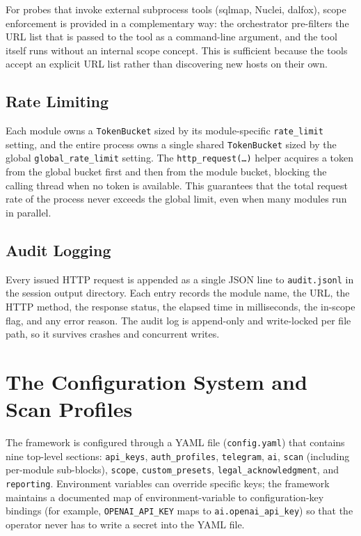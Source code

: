 For probes that invoke external subprocess tools (sqlmap, Nuclei, dalfox), scope enforcement is provided in a complementary way: the orchestrator pre-filters the URL list that is passed to the tool as a command-line argument, and the tool itself runs without an internal scope concept. This is sufficient because the tools accept an explicit URL list rather than discovering new hosts on their own.

\subsection{Rate Limiting}

Each module owns a \texttt{TokenBucket} sized by its module-specific \texttt{rate\_limit} setting, and the entire process owns a single shared \texttt{TokenBucket} sized by the global \texttt{global\_rate\_limit} setting. The \texttt{http\_request(\dots)} helper acquires a token from the global bucket first and then from the module bucket, blocking the calling thread when no token is available. This guarantees that the total request rate of the process never exceeds the global limit, even when many modules run in parallel.

\subsection{Audit Logging}

Every issued HTTP request is appended as a single JSON line to \texttt{audit.jsonl} in the session output directory. Each entry records the module name, the URL, the HTTP method, the response status, the elapsed time in milliseconds, the in-scope flag, and any error reason. The audit log is append-only and write-locked per file path, so it survives crashes and concurrent writes.

\section{The Configuration System and Scan Profiles}

The framework is configured through a YAML file (\texttt{config.yaml}) that contains nine top-level sections: \texttt{api\_keys}, \texttt{auth\_profiles}, \texttt{telegram}, \texttt{ai}, \texttt{scan} (including per-module sub-blocks), \texttt{scope}, \texttt{custom\_presets}, \texttt{legal\_acknowledgment}, and \texttt{reporting}. Environment variables can override specific keys; the framework maintains a documented map of environment-variable to configuration-key bindings (for example, \texttt{OPENAI\_API\_KEY} maps to \texttt{ai.openai\_api\_key}) so that the operator never has to write a secret into the YAML file.

